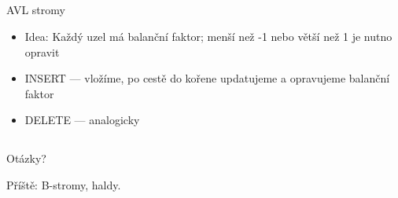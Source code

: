 \documentclass{beamer}
\begin{document}
\subsection{}
\begin{frame}{AVL stromy}
\begin{itemize}
\item Idea: Každý uzel má balanční faktor; menší než -1 nebo větší než 1 je nutno opravit
\item INSERT --- vložíme, po cestě do kořene updatujeme a opravujeme balanční faktor
\item DELETE --- analogicky
\end{itemize}
\end{frame}

\subsection{}
\begin{frame}{Otázky?}
\begin{center}
Příště: B-stromy, haldy.
\end{center}
\end{frame}

\subsection{}
\end{document}
